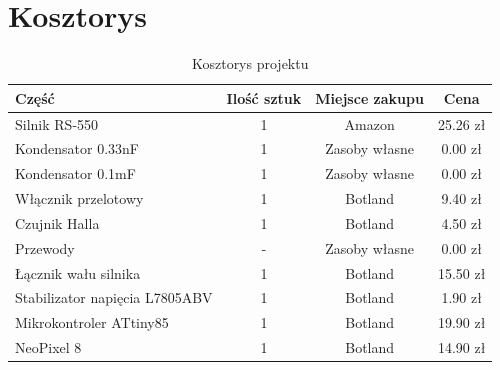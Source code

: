 \documentclass{article}
\begin{document}
\section{Kosztorys}
\begin{table}[H]
\centering
\begin{tabular}{lccc}
\toprule
Część & Ilość sztuk & Miejsce zakupu & Cena \\
\midrule
Silnik RS-550 & 1 & Amazon & 25.26 zł \\
Kondensator 0.33nF & 1 & Zasoby własne & 0.00 zł \\
Kondensator 0.1mF & 1 & Zasoby własne & 0.00 zł \\
Włącznik przelotowy & 1 & Botland & 9.40 zł \\
Czujnik Halla & 1 & Botland & 4.50 zł \\
Przewody & - & Zasoby własne & 0.00 zł \\
Łącznik wału silnika & 1 & Botland & 15.50 zł \\
Stabilizator napięcia L7805ABV & 1 & Botland & 1.90 zł \\
Mikrokontroler ATtiny85 & 1 & Botland & 19.90 zł \\
NeoPixel 8 & 1 & Botland & 14.90 zł \\
\bottomrule
\end{tabular}
\caption{Kosztorys projektu}
\end{table}
\end{document}
